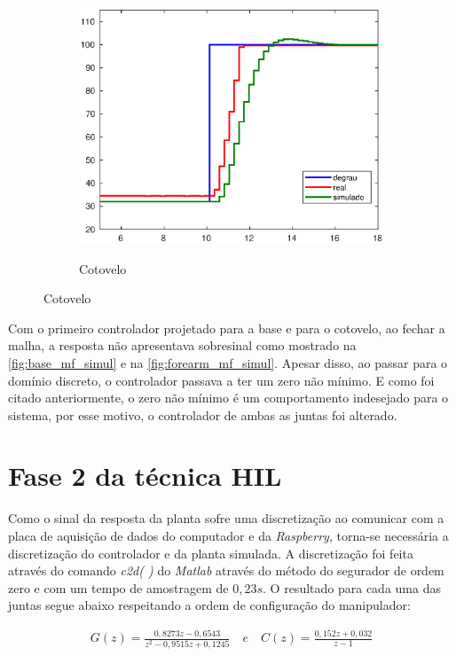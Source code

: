 \begin{figure}[h!]
\begin{subfigure}{.5\textwidth}
    \label{fig:shoulder_mf_simul}
  \end{subfigure}%
  \\[5ex]
  \begin{subfigure}{\textwidth}
    \centering
    \caption{Cotovelo}
    \includegraphics[width = 0.55\columnwidth]{Imagens/forearm_mf_simul}
    \label{fig:forearm_mf_simul}
  \end{subfigure}%
  
  \label{fig:malhaFechadaHil1} 

\end{figure}

Com o primeiro controlador projetado para a base e para o cotovelo, ao fechar a malha, a resposta não apresentava
sobresinal como mostrado na \autoref{fig:base_mf_simul} e na \autoref{fig:forearm_mf_simul}. Apesar disso,
ao passar para o domínio discreto, o controlador passava a ter um zero não mínimo. E como foi citado 
anteriormente, o zero não mínimo é um comportamento indesejado para o sistema, por esse motivo, o controlador
de ambas as juntas foi alterado.

\section{Fase 2 da técnica HIL}

Como o sinal da resposta da planta sofre uma discretização ao comunicar com a placa de aquisição de dados do
computador e da \textit{Raspberry}, torna-se necessária a discretização do controlador e da planta simulada. A 
discretização foi feita através do comando \textit{c2d( )} do \textit{Matlab} através do método do segurador de 
ordem zero e com um tempo de amostragem de $0,23s$. O resultado para cada uma das juntas
segue abaixo respeitando a ordem de configuração do manipulador:

\begin{equation}
  \begin{gathered}
    G(z) = \frac{0,8273z - 0,6543}{z^2 - 0,9515z + 0,1245} \quad e \quad C(z) = \frac{0,152z + 0,032}{z - 1}
  \end{gathered}
  \label{eq:base_discrete}
\end{equation}

